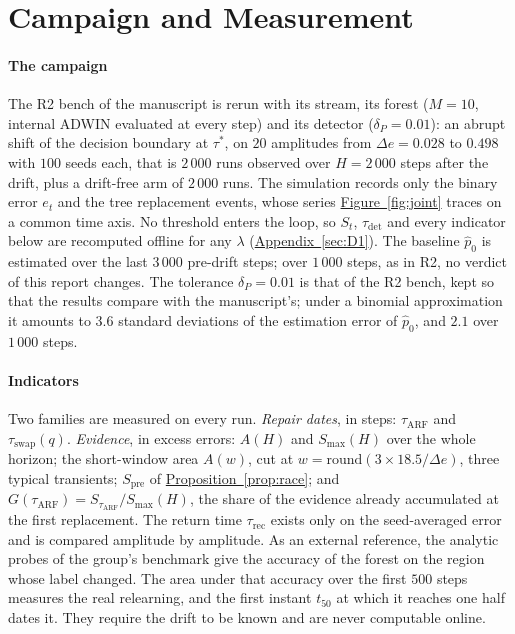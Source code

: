 \documentclass[10pt,conference]{IEEEtran}
\theoremstyle{definition}
\begin{document}
\section{Campaign and Measurement}
\label{sec:campaign}

\paragraph{The campaign} The R2 bench of the manuscript is rerun with its stream, its
forest ($M = 10$, internal ADWIN evaluated at every step) and its detector
($\delta_P = 0.01$): an abrupt shift of the decision boundary at $\tau^*$, on $20$
amplitudes from $\Delta e = 0.028$ to $0.498$ with $100$ seeds each, that is $2\,000$ runs
observed over $H = 2\,000$ steps after the drift, plus a drift-free arm of $2\,000$ runs.
The simulation records only the binary error $e_t$ and the tree replacement events, whose
series \hyperref[fig:joint]{Figure~\ref*{fig:joint}} traces on a common time axis. No
threshold enters the loop, so $S_t$, $\tau_{\mathrm{det}}$ and every indicator below are
recomputed offline for any $\lambda$ (\hyperref[sec:D1]{Appendix~\ref*{sec:D1}}). The baseline $\hat p_0$ is
estimated over the last $3\,000$ pre-drift steps; over $1\,000$ steps, as in R2, no verdict
of this report changes. The tolerance $\delta_P = 0.01$ is that of the R2 bench, kept so that the
results compare with the manuscript's; under a binomial approximation it amounts to $3.6$
standard deviations of the estimation error of $\hat p_0$, and $2.1$ over $1\,000$ steps.

\paragraph{Indicators} Two families are measured on every run. \emph{Repair dates}, in
steps: $\tau_{\mathrm{ARF}}$ and $\tau_{\mathrm{swap}}(q)$. \emph{Evidence}, in excess
errors: $A(H)$ and $S_{\max}(H)$ over the whole horizon; the short-window area $A(w)$, cut at
$w = \mathrm{round}(3 \times 18.5/\Delta e)$, three typical transients; $S_{\mathrm{pre}}$
of \hyperref[prop:race]{Proposition~\ref*{prop:race}}; and $G(\tau_{\mathrm{ARF}}) =
S_{\tau_{\mathrm{ARF}}}/S_{\max}(H)$, the share of the evidence already accumulated at the
first replacement. The return time $\tau_{\mathrm{rec}}$ exists only on the seed-averaged
error and is compared amplitude by amplitude. As an external reference, the analytic
probes of the group's benchmark give the accuracy of the forest on the region whose label
changed. The area under that accuracy over the first $500$ steps measures the real
relearning, and the first instant $t_{50}$ at which it reaches one half dates it. They require the drift to be known and are
never computable online.
\end{document}

